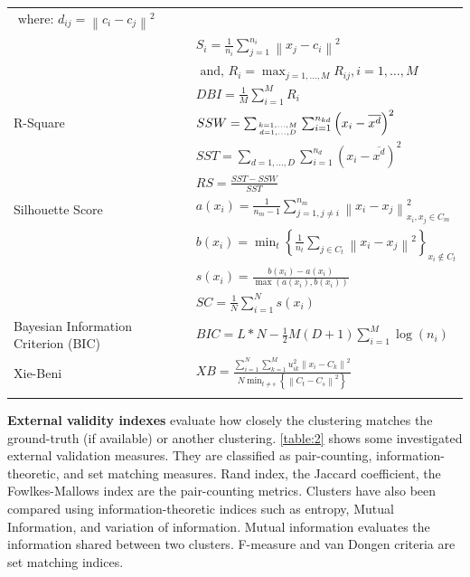 \documentclass[a4paper, 12pt]{article}
\begin{document}
\begin{tabularx}{\linewidth}{|X|l|}
    $\text { where: } d_{i j}=\left\|c_{i}-c_{j}\right\|^{2}$ \\ &
    $S_{i}=\frac{1}{n_{i}} \sum_{j=1}^{n_{i}}\left\|x_{j}-c_{i}\right\|^{2}$ \\ &
    $\text { and, } R_{i}=\max _{j=1, \ldots, M} R_{i j}, i=1, \ldots, M$ \\ &
    $D B I=\frac{1}{M} \sum_{i=1}^{M} R_{i}$ \\
    \hline R-Square & $S S W=\sum_{k=1, \ldots, M \atop d=1, \ldots, D} \sum_{i=1}^{n_{k d}}\left(x_{i}-\overline{x^{d}}\right)^{2}$ \\ &
    $S S T=\sum_{d=1, \ldots, D} \sum_{i=1}^{n_{d}}\left(x_{i}-\overline{x^{d}}\right)^{2}$ \\ &
    $R S=\frac{S S T-S S W}{S S T}$ \\
    \hline Silhouette Score & $a\left(x_{i}\right)=\frac{1}{n_{m}-1} \sum_{j=1, j \neq i}^{n_{m}}\left\|x_{i}-x_{j}\right\|_{x_{i}, x_{j} \in C_{m}}^{2}$ \\ &
    $b\left(x_{i}\right)=\min _{t}\left\{\frac{1}{n_{t}} \sum_{j \in C_{t}}\left\|x_{i}-x_{j}\right\|^{2}\right\}_{x_{i} \notin C_{t}}$ \\ &
    $s\left(x_{i}\right)=\frac{b\left(x_{i}\right)-a\left(x_{i}\right)}{\max \left(a\left(x_{i}\right), b\left(x_{i}\right)\right)}$ \\ &
    $S C=\frac{1}{N} \sum_{i=1}^{N} s\left(x_{i}\right)$ \\
    \hline Bayesian Information Criterion (BIC) & $B I C=L * N-\frac{1}{2} M(D+1) \sum_{i=1}^{M} \log \left(n_{i}\right)$ \\
    \hline Xie-Beni & $X B=\frac{\sum_{i=1}^{N} \sum_{k=1}^{M} u_{i k}^{2}\left\|x_{i}-C_{k}\right\|^{2}}{N \min _{t \neq s}\left\{\left\|C_{t}-C_{s}\right\|^{2}\right\}}$ \\
    \hline
    \label{table:1}
\end{tabularx}

\textbf{External validity indexes} evaluate how closely the clustering matches the ground-truth (if available) or another clustering. \autoref{table:2} shows some investigated external validation measures. They are classified as pair-counting, information-theoretic, and set matching measures. Rand index, the Jaccard coefficient, the Fowlkes-Mallows index are the pair-counting metrics. Clusters have also been compared using information-theoretic indices such as entropy, Mutual Information, and variation of information. Mutual information evaluates the information shared between two clusters. F-measure and van Dongen criteria are set matching indices. 
\end{document}
